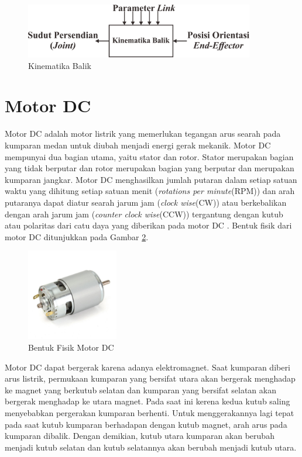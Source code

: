 \begin{figure}[H]
	\centering
	\includegraphics[width=10cm]{gambar/kinematika_balik.png}
	\caption{Kinematika Balik}
	\label{pic.kinematikabalik}
\end{figure}

\section{Motor DC}
Motor DC adalah motor listrik yang memerlukan tegangan arus searah pada kumparan medan untuk diubah menjadi energi gerak mekanik. Motor DC mempunyai dua bagian utama, yaitu stator dan rotor. Stator merupakan bagian yang tidak berputar dan rotor merupakan bagian yang berputar dan merupakan kumparan jangkar. Motor DC menghasilkan jumlah putaran dalam setiap satuan waktu yang dihitung setiap satuan menit (\textit{rotations per minute}(RPM)) dan arah putaranya dapat diatur searah jarum jam (\textit{clock wise}(CW)) atau berkebalikan dengan arah jarum jam (\textit{counter clock wise}(CCW)) tergantung dengan kutub atau polaritas dari catu daya yang diberikan pada motor DC \cite{dickson}. Bentuk fisik dari motor DC ditunjukkan pada Gambar \ref{pic.motordc}.
\begin{figure}[H]
	\centering
	\includegraphics[width=4cm]{gambar/motorDC.jpeg}
	\caption{Bentuk Fisik Motor DC}
	\label{pic.motordc}
\end{figure}

Motor DC dapat bergerak karena adanya elektromagnet. Saat kumparan diberi arus listrik, permukaan kumparan yang bersifat utara akan bergerak menghadap ke magnet yang berkutub selatan dan kumparan yang bersifat selatan akan bergerak menghadap ke utara magnet. Pada saat ini kerena kedua kutub saling menyebabkan pergerakan kumparan berhenti. Untuk menggerakannya lagi tepat pada saat kutub kumparan berhadapan dengan kutub magnet, arah arus pada kumparan dibalik. Dengan demikian, kutub utara kumparan akan berubah menjadi kutub selatan dan kutub selatannya akan berubah menjadi kutub utara\cite{otomotif}.  

